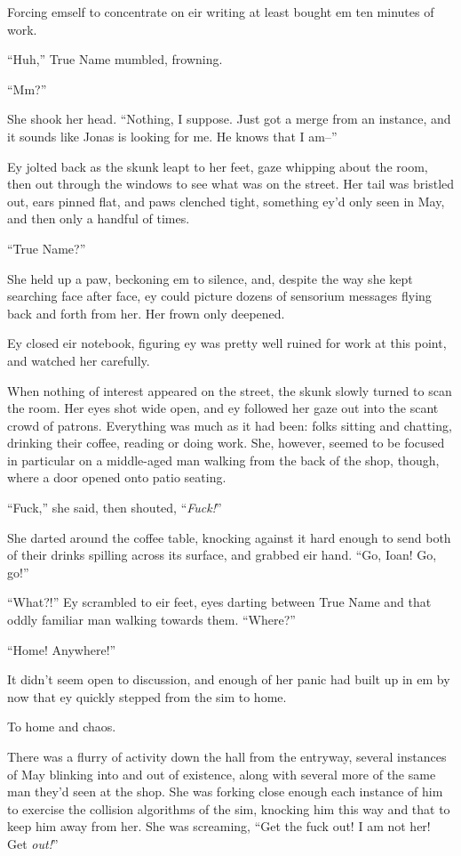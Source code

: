 Forcing emself to concentrate on eir writing at least bought em ten minutes of work.

``Huh,'' True Name mumbled, frowning.

``Mm?''

She shook her head. ``Nothing, I suppose. Just got a merge from an instance, and it sounds like Jonas is looking for me. He knows that I am--''

Ey jolted back as the skunk leapt to her feet, gaze whipping about the room, then out through the windows to see what was on the street. Her tail was bristled out, ears pinned flat, and paws clenched tight, something ey'd only seen in May, and then only a handful of times.

``True Name?''

She held up a paw, beckoning em to silence, and, despite the way she kept searching face after face, ey could picture dozens of sensorium messages flying back and forth from her. Her frown only deepened.

Ey closed eir notebook, figuring ey was pretty well ruined for work at this point, and watched her carefully.

When nothing of interest appeared on the street, the skunk slowly turned to scan the room. Her eyes shot wide open, and ey followed her gaze out into the scant crowd of patrons. Everything was much as it had been: folks sitting and chatting, drinking their coffee, reading or doing work. She, however, seemed to be focused in particular on a middle-aged man walking from the back of the shop, though, where a door opened onto patio seating.

``Fuck,'' she said, then shouted, ``\emph{Fuck!}''

She darted around the coffee table, knocking against it hard enough to send both of their drinks spilling across its surface, and grabbed eir hand. ``Go, Ioan! Go, go!''

``What?!'' Ey scrambled to eir feet, eyes darting between True Name and that oddly familiar man walking towards them. ``Where?''

``Home! Anywhere!''

It didn't seem open to discussion, and enough of her panic had built up in em by now that ey quickly stepped from the sim to home.

To home and chaos.

There was a flurry of activity down the hall from the entryway, several instances of May blinking into and out of existence, along with several more of the same man they'd seen at the shop. She was forking close enough each instance of him to exercise the collision algorithms of the sim, knocking him this way and that to keep him away from her. She was screaming, ``Get the fuck out! I am not her! Get \emph{out!}''

